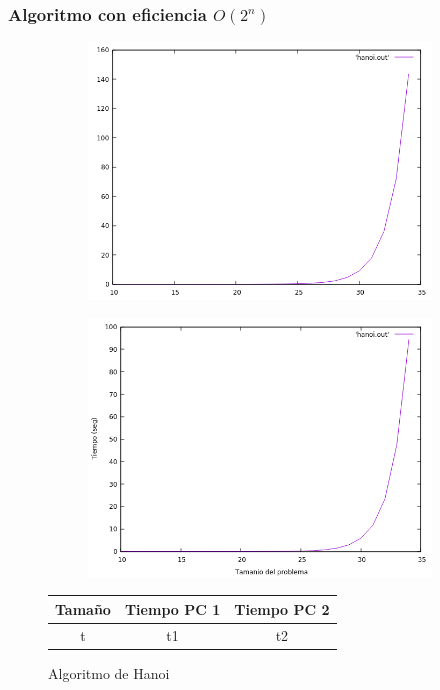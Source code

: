 \documentclass[12pt,spanish]{article}
\begin{document}
\subsubsection{Algoritmo con eficiencia $O(2^n)$}

\begin{figure}[H]
\centering
\begin{subfigure}[b]{0.45\textwidth}
\includegraphics[scale=0.45]{empirica_hanoi.png}
\caption{}
\end{subfigure}
\quad
\begin{subfigure}[b]{0.45\textwidth}
\includegraphics[scale=0.45]{empirica_hanoi_2.png}
\caption{}
\end{subfigure}
\begin{tabular}{|c|c|c|}
\hline
\textbf{Tamaño} & \textbf{Tiempo PC 1} & \textbf{Tiempo PC 2} \\
\hline
t & t1 & t2 \\
\hline
\end{tabular}
\caption{Algoritmo de Hanoi}
\end{figure}
\end{document}

